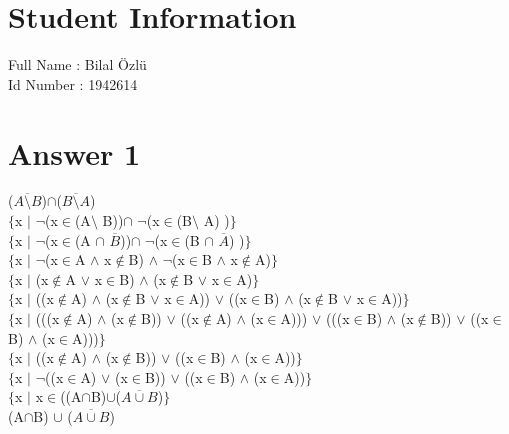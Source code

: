 \documentclass[12pt]{article}
\begin{document}
\section*{Student Information } 
Full Name : Bilal Özlü \\
Id Number : 1942614 \\

\section*{Answer 1}
($\overline{A \setminus	B}$)$\cap$($\overline{B \setminus	A}$) \\
$\lbrace$x $\vert$ $\neg$(x$\in$(A$\setminus$	B))$\cap$ $\neg$(x$\in$(B$\setminus$	A) )$\rbrace$ \\
$\lbrace$x $\vert$ $\neg$(x$\in$(A	$\cap$  $\overline{B}$))$\cap$ $\neg$(x$\in$(B $\cap$ $\overline{A}$) )$\rbrace$ \\
$\lbrace$x $\vert$ $\neg$(x$\in$A $\wedge$ x$\notin$B) $\wedge$ $\neg$(x$\in$B $\wedge$ x$\notin$A)$\rbrace$ \\
$\lbrace$x $\vert$ (x$\notin$A $\vee$ x$\in$B) $\wedge$ (x$\notin$B $\vee$ x$\in$A)$\rbrace$ \\
$\lbrace$x $\vert$ ((x$\notin$A) $\wedge$ (x$\notin$B $\vee$ x$\in$A)) $\vee$ ((x$\in$B) $\wedge$ (x$\notin$B $\vee$ x$\in$A))$\rbrace$ \\
$\lbrace$x $\vert$ (((x$\notin$A) $\wedge$ (x$\notin$B)) $\vee$ ((x$\notin$A) $\wedge$ (x$\in$A))) $\vee$ (((x$\in$B) $\wedge$ (x$\notin$B)) $\vee$ ((x$\in$B) $\wedge$ (x$\in$A)))$\rbrace$ \\
$\lbrace$x $\vert$ ((x$\notin$A) $\wedge$ (x$\notin$B)) $\vee$ ((x$\in$B) $\wedge$ (x$\in$A))$\rbrace$ \\
$\lbrace$x $\vert$ $\neg$((x$\in$A) $\vee$ (x$\in$B)) $\vee$ ((x$\in$B) $\wedge$ (x$\in$A))$\rbrace$ \\
$\lbrace$x $\vert$ x$\in$((A$\cap$B)$\cup$($\overline{A	\cup B}$)$\rbrace$ \\
(A$\cap$B) $\cup$ ($\overline{A	\cup B}$)
\end{document}
